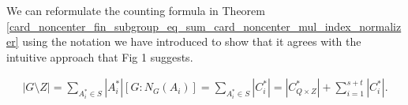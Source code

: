 




We can reformulate the counting formula in Theorem \ref{card_noncenter_fin_subgroup_eq_sum_card_noncenter_mul_index_normalizer} using the notation we have introduced to show that it agrees with the intuitive approach that Fig 1 suggests.

\begin{align*} 
  |G \! \setminus \! Z| = \sum_{A_i^* \in S} |A_i^*| [G:N_G(A_i)] = \sum_{A_i^* \in S} |C_i^*| = |C_{Q \times Z}^*| + \sum_{i=1}^{s+t} |C_i^*|.
\end{align*}

